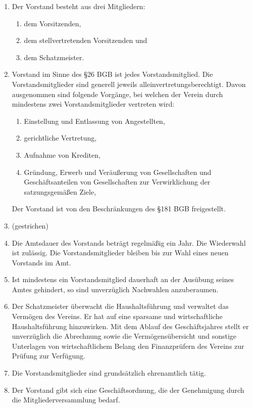 \documentclass[10pt,a4paper]{scrartcl}
\begin{document}
\begin{enumerate}[label=(\arabic*)]
\item
  Der Vorstand besteht aus drei Mitgliedern:
  \begin{enumerate}[label=(\alph*)]
  \item
    dem Vorsitzenden,
  \item
    dem stellvertretenden Vorsitzenden und
  \item
    dem Schatzmeister.
  \end{enumerate}
\item
  Vorstand im Sinne des §26 BGB ist jedes Vorstandsmitglied. Die Vorstandsmitglieder
  sind generell jeweils alleinvertretungsberechtigt. Davon ausgenommen sind folgende
  Vorgänge, bei welchen der Verein durch mindestens zwei Vorstandsmitglieder
  vertreten wird:
  \begin{enumerate}[label=(\alph*)]
  \item
    Einstellung und Entlassung von Angestellten,
  \item
    gerichtliche Vertretung,
  \item
    Aufnahme von Krediten,
  \item
    Gründung, Erwerb und Veräußerung von Gesellschaften und Geschäftsanteilen von
    Gesellschaften zur Verwirklichung der satzungsgemäßen Ziele,
  \end{enumerate}
  Der Vorstand ist von den Beschränkungen des §181 BGB freigestellt.
\item
  (gestrichen)
\item
  Die Amtsdauer des Vorstands beträgt regelmäßig ein Jahr. Die Wiederwahl ist zulässig.
  Die Vorstandsmitglieder bleiben bis zur Wahl eines neuen Vorstands im Amt.
\item
  Ist mindestens ein Vorstandsmitglied dauerhaft an der Ausübung seines Amtes
  gehindert, so sind unverzüglich Nachwahlen anzuberaumen.
\item
  Der Schatzmeister überwacht die Haushaltsführung und verwaltet das Vermögen des
  Vereins. Er hat auf eine sparsame und wirtschaftliche Haushaltsführung hinzuwirken.
  Mit dem Ablauf des Geschäftsjahres stellt er unverzüglich die Abrechnung sowie die
  Vermögensübersicht und sonstige Unterlagen von wirtschaftlichem Belang den
  Finanzprüfern des Vereins zur Prüfung zur Verfügung.
\item
  Die Vorstandsmitglieder sind grundsätzlich ehrenamtlich tätig.
\item
  Der Vorstand gibt sich eine Geschäftsordnung, die der Genehmigung durch die
  Mitgliederversammlung bedarf.
\end{enumerate}
\end{document}
